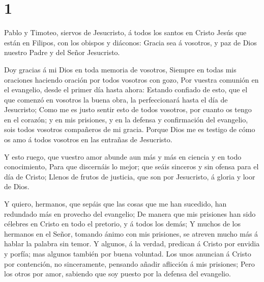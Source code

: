 \hypertarget{section}{%
\section{1}\label{section}}

 Pablo y Timoteo, siervos de Jesucristo, á todos los santos
en Cristo Jesús que están en Filipos, con los obispos y diáconos:
 Gracia sea á vosotros, y paz de Dios nuestro Padre y del
Señor Jesucristo.

 Doy gracias á mi Dios en toda memoria de vosotros,
 Siempre en todas mis oraciones haciendo oración por todos
vosotros con gozo,  Por vuestra comunión en el evangelio,
desde el primer día hasta ahora:  Estando confiado de esto,
que el que comenzó en vosotros la buena obra, la perfeccionará hasta el
día de Jesucristo;  Como me es justo sentir esto de todos
vosotros, por cuanto os tengo en el corazón; y en mis prisiones, y en la
defensa y confirmación del evangelio, sois todos vosotros compañeros de
mi gracia.  Porque Dios me es testigo de cómo os amo á todos
vosotros en las entrañas de Jesucristo.

 Y esto ruego, que vuestro amor abunde aun más y más en
ciencia y en todo conocimiento,  Para que discernáis lo
mejor; que seáis sinceros y sin ofensa para el día de Cristo;
 Llenos de frutos de justicia, que son por Jesucristo, á
gloria y loor de Dios.

 Y quiero, hermanos, que sepáis que las cosas que me han
sucedido, han redundado más en provecho del evangelio;  De
manera que mis prisiones han sido célebres en Cristo en todo el
pretorio, y á todos los demás;  Y muchos de los hermanos en
el Señor, tomando ánimo con mis prisiones, se atreven mucho más á hablar
la palabra sin temor.  Y algunos, á la verdad, predican á
Cristo por envidia y porfía; mas algunos también por buena voluntad.
 Los unos anuncian á Cristo por contención, no
sinceramente, pensando añadir aflicción á mis prisiones; 
Pero los otros por amor, sabiendo que soy puesto por la defensa del
evangelio.

